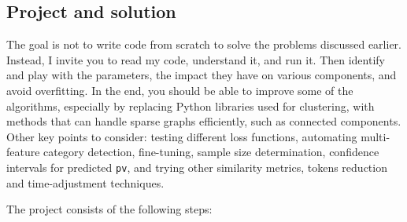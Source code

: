 \documentclass[oneside,10pt]{book}
\begin{document}
\subsection{Project and solution} 

The goal is not to write code from scratch to solve the problems discussed earlier. Instead, I invite you to read my code, understand it, and run it. Then identify and play with the parameters, the impact they have on various components, and avoid overfitting. In the end, you should be able to improve some of the algorithms, especially 
 by replacing Python libraries used for clustering, with methods that can handle sparse graphs efficiently, such as connected components. 
Other key points to consider: testing different loss functions, automating multi-feature category detection,  fine-tuning, sample size determination, confidence intervals for 
predicted \texttt{pv}, 
and trying other similarity metrics, tokens reduction and time-adjustment techniques. 
\vspace{1ex}

\noindent The project consists of the following steps:
\vspace{1ex}
\end{document}
